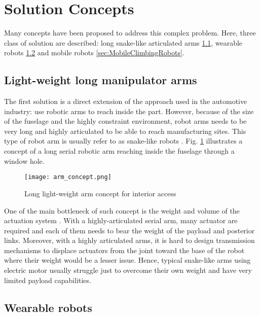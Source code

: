\section{Solution Concepts}

Many concepts have been proposed to address this complex problem. Here, three class of solution are described: long snake-like articulated arms \ref{sec:LightWeightLongManipulatorArm}, wearable robots \ref{sec:WearableRobots} and mobile robots \ref{sec:MobileClimbingRobots}.

\subsection{Light-weight long manipulator arms}
\label{sec:LightWeightLongManipulatorArm}

The first solution is a direct extension of the approach used in the automotive industry: use robotic arms to reach inside the part. However, because of the size of the fuselage and the highly constraint environment, robot arms needs to be very long and highly articulated to be able to reach manufacturing sites. This type of robot arm is usually refer to as snake-like robots \cite{buckingham_r._chitrakaran_v._conkie_r._ferguson_g._et_al._snake-arm_2007}. Fig. \ref{fig:arm_concept} illustrates a concept of a long serial robotic arm reaching inside the fuselage through a window hole.

\begin{figure}[H]
	\centering
		\texttt{[image: arm\_concept.png]}
		\caption{Long light-weight arm concept for interior access}
	\label{fig:arm_concept}
\end{figure}

One of the main bottleneck of such concept is the weight and volume of the actuation system \cite{roy_nonlinear_2009}. With a highly-articulated serial arm, many actuator are required and each of them needs to bear the weight of the payload and posterior links. Moreover, with a highly articulated arms, it is hard to design transmission mechanisms to displace actuators from the joint toward the base of the robot where their weight would be a lesser issue. Hence, typical snake-like arms using electric motor usually struggle just to overcome their own weight and have very limited payload capabilities.


\subsection{Wearable robots}
\label{sec:WearableRobots}

